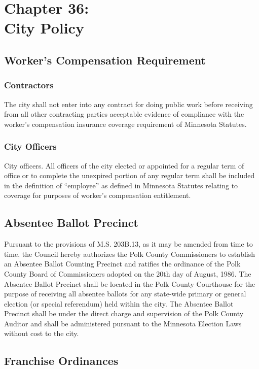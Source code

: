 \chapter*{Chapter 36: \\
	City Policy}
    \vfill
    \minitoc
    \pagebreak
    
\section{Worker's Compensation Requirement}
\subsection{Contractors}
The city shall not enter into any contract for doing public work before receiving from all other contracting parties acceptable evidence of compliance with the worker’s compensation insurance coverage requirement of Minnesota Statutes.
\subsection{City Officers}
City officers.  All officers of the city elected or appointed for a regular term of office or to complete the unexpired portion of any regular term shall be included in the definition of “employee” as defined in Minnesota Statutes relating to coverage for purposes of worker’s compensation entitlement.

\section{Absentee Ballot Precinct}
Pursuant to the provisions of M.S. \textsection 203B.13, as it may be amended from time to time, the Council hereby authorizes the Polk County Commissioners to establish an Absentee Ballot Counting Precinct and ratifies the ordinance of the Polk County Board of Commissioners adopted on the 20th day of August, 1986.  The Absentee Ballot Precinct shall be located in the Polk County Courthouse for the purpose of receiving all absentee ballots for any state-wide primary or general election (or special referendum) held within the city.  The Absentee Ballot Precinct shall be under the direct charge and supervision of the Polk County Auditor and shall be administered pursuant to the Minnesota Election Laws without cost to the city.

\section{Franchise Ordinances}
